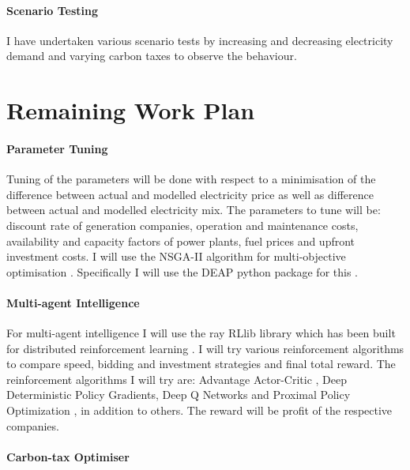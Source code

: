 \documentclass[12pt]{article}
\begin{document}
\paragraph{Scenario Testing}

I have undertaken various scenario tests by increasing and decreasing electricity demand and varying carbon taxes to observe the behaviour.







\clearpage

\section{Remaining Work Plan}

\paragraph{Parameter Tuning}

Tuning of the parameters will be done with respect to a minimisation of the difference between actual and modelled electricity price as well as difference between actual and modelled electricity mix. The parameters to tune will be: discount rate of generation companies, operation and maintenance costs, availability and capacity factors of power plants, fuel prices and upfront investment costs. I will use the NSGA-II algorithm for multi-objective optimisation \cite{Valkanas2014}. Specifically I will use the DEAP python package for this \cite{Gagn2012}.

\paragraph{Multi-agent Intelligence}

For multi-agent intelligence I will use the ray RLlib library which has been built for distributed reinforcement learning \cite{Liang2014}. I will try various reinforcement algorithms to compare speed, bidding and investment strategies and final total reward. The reinforcement algorithms I will try are: Advantage Actor-Critic \cite{Mnih2016}, Deep Deterministic Policy Gradients, Deep Q Networks \cite{Mnih2013} and Proximal Policy Optimization \cite{Schulman2017}, in addition to others. The reward will be profit of the respective companies.

\paragraph{Carbon-tax Optimiser}
\end{document}
